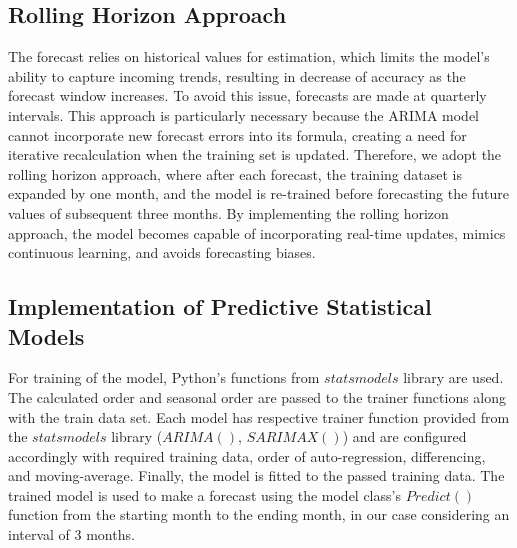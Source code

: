 \documentclass[]{usiinfbachelorproject}
\begin{document}
\subsection{Rolling Horizon Approach}
The forecast relies on historical values for estimation, which limits the model's ability to capture incoming trends, resulting in decrease of accuracy as the forecast window increases. To avoid this issue, forecasts are made at quarterly intervals. This approach is particularly necessary because the ARIMA model cannot incorporate new forecast errors into its formula, creating a need for iterative recalculation when the training set is updated. Therefore, we adopt the rolling horizon approach, where after each forecast, the training dataset is expanded by one month, and the model is re-trained before forecasting the future values of subsequent three months. By implementing the rolling horizon approach, the model becomes capable of incorporating real-time updates, mimics continuous learning, and avoids forecasting biases. \\

\subsection{Implementation of Predictive Statistical Models}

For training of the model, Python's functions from ${statsmodels}$ library are used. The calculated order and seasonal order are passed to the trainer functions along with the train data set. Each model has respective trainer function provided from the ${statsmodels}$ library ($ARIMA()$, $SARIMAX()$) and are configured accordingly with required training data, order of auto-regression, differencing, and moving-average. Finally, the model is fitted to the passed training data. 
The trained model is used to make a forecast using the model class's ${Predict()}$ function from the starting month to the ending month, in our case considering an interval of 3 months. \\


\newpage



\end{document}
